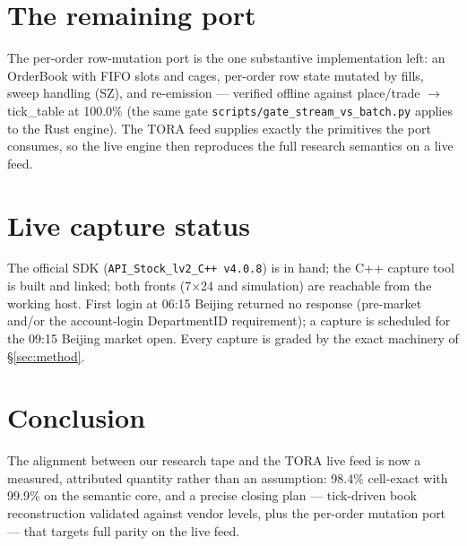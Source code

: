 \documentclass[11pt,a4paper]{article}
\begin{document}
\section{The remaining port}
\label{sec:port}

The per-order row-mutation port is the one substantive implementation left:
an OrderBook with FIFO slots and cages, per-order row state mutated by fills,
sweep handling (SZ), and re-emission --- verified offline against
place/trade $\rightarrow$ tick\_table at 100.0\% (the same gate
\texttt{scripts/gate\_stream\_vs\_batch.py} applies to the Rust engine).
The TORA feed supplies exactly the primitives the port consumes, so the live
engine then reproduces the full research semantics on a live feed.

\section{Live capture status}
\label{sec:live}

The official SDK (\texttt{API\_Stock\_lv2\_C++ v4.0.8}) is in hand; the C++
capture tool is built and linked; both fronts (7$\times$24 and simulation)
are reachable from the working host. First login at 06:15 Beijing returned
no response (pre-market and/or the account-login DepartmentID requirement);
a capture is scheduled for the 09:15 Beijing market open. Every capture is
graded by the exact machinery of \S\ref{sec:method}.

\section{Conclusion}

The alignment between our research tape and the TORA live feed is now a
measured, attributed quantity rather than an assumption: 98.4\% cell-exact
with 99.9\% on the semantic core, and a precise closing plan --- tick-driven
book reconstruction validated against vendor levels, plus the per-order
mutation port --- that targets full parity on the live feed.
\end{document}
